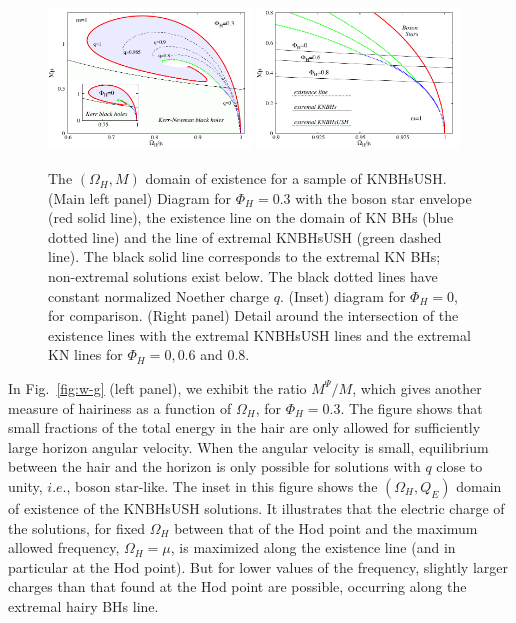 \begin{figure}[h!]
  \begin{center}
    \includegraphics[width=0.48\textwidth]{papers/KerrNewman/BH-w-M} 
    \includegraphics[width=0.48\textwidth]{papers/KerrNewman/zoom-w-M}
  \end{center}
  \caption{The $(\Omega_H,M)$ domain of existence for a sample of KNBHsUSH. (Main left panel) Diagram for $\Phi_H=0.3$ with the boson star envelope (red solid line), the existence line on the domain of KN BHs (blue dotted line) and the line of extremal KNBHsUSH (green dashed line). The black solid line corresponds to the extremal KN BHs; non-extremal solutions exist below. The black dotted lines have constant normalized Noether charge $q$. (Inset) diagram for $\Phi_H=0$, for comparison. (Right panel) Detail around the intersection of the existence lines with the extremal KNBHsUSH lines and the extremal KN lines for $\Phi_H=0,0.6$ and $0.8$.  
	}
  \label{fig:w-M}
\end{figure}
 
  
 In Fig.~\ref{fig:w-g} (left panel), we exhibit the ratio $ M^{\Psi}/M$, which gives another measure of hairiness
   as a function of $\Omega_H$,
for $\Phi_H=0.3$. The figure shows that small fractions of the total energy in the hair are only allowed for sufficiently large horizon angular velocity. When the angular velocity is small, equilibrium between the hair and the horizon is only possible for solutions with $q$ close to unity, $i.e.$, boson star-like. 
The inset in this figure shows the $(\Omega_H,Q_E)$ domain of existence of the KNBHsUSH solutions. It illustrates that the electric charge of the solutions, for fixed $\Omega_H$ between that of the Hod point and the maximum allowed frequency, $\Omega_H=\mu$, is maximized along the existence line (and in particular at the Hod point). But for lower values of the frequency, slightly larger charges than that found at the Hod point are possible, occurring along the extremal hairy BHs line.

